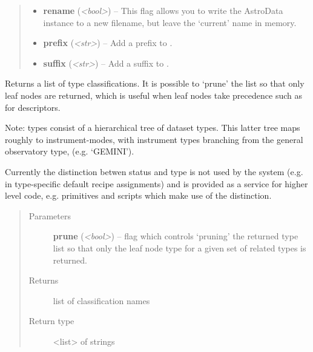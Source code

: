 \documentclass[letterpaper,10pt,english]{sphinxmanual}
\begin{document}
\begin{fulllineitems}
\begin{fulllineitems}
\begin{quote}
\begin{description}
\begin{itemize}
\item {} 
\textbf{rename} (\emph{\textless{}bool\textgreater{}}) -- This flag allows you to write the AstroData instance to
a new filename, but leave the `current' name in memory.

\item {} 
\textbf{prefix} (\emph{\textless{}str\textgreater{}}) -- Add a prefix to .

\item {} 
\textbf{suffix} (\emph{\textless{}str\textgreater{}}) -- Add a suffix to .

\end{itemize}

\end{description}\end{quote}

\end{fulllineitems}


\begin{fulllineitems}
\label{astro_class:astrodata.AstroData.AstroData.type}
Returns a list of type classifications. It is possible to `prune' 
the list so that only leaf nodes are returned, which is 
useful when leaf nodes take precedence such as for descriptors.

Note: types consist of a hierarchical tree of dataset types.
This latter tree maps roughly to instrument-modes, with instrument 
types branching from the general observatory type, (e.g. `GEMINI').

Currently the distinction betwen status and type is not used by the
system (e.g. in type-specific default recipe assignments) and is
provided as a service for higher level code, e.g. primitives and
scripts which make use of the distinction.
\begin{quote}\begin{description}
\item[{Parameters}] \leavevmode
\textbf{prune} (\emph{\textless{}bool\textgreater{}}) -- flag which controls `pruning' the returned type list 
so that only the leaf node type for a given set of 
related types is returned.

\item[{Returns}] \leavevmode
list of classification names

\item[{Return type}] \leavevmode
\textless{}list\textgreater{} of strings


\end{description}
\end{quote}
\end{fulllineitems}
\end{fulllineitems}
\end{document}
